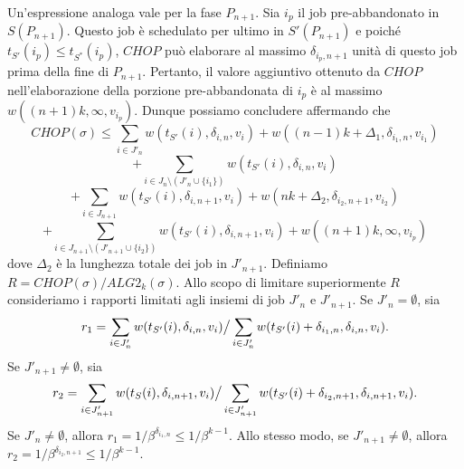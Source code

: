 \documentclass[twoside,openany,titlepage,fleqn,
	headinclude,12pt,a4paper,BCOR5mm,footinclude]{scrbook}
\begin{document}
Un'espressione analoga vale per la fase $P_{n + 1}$. Sia $i_{p}$ il job pre-abbandonato in $S(P_{n + 1})$. Questo job è schedulato per ultimo in $S'(P_{n + 1})$ e poiché $t_{S'}(i_{p}) \leq t_{S^{*}} (i_{p})$, $CHOP$ può elaborare al massimo $\delta_{i_{p}, n+1}$ unità di questo job prima della fine di $P_{n + 1}$. Pertanto, il valore aggiuntivo ottenuto da $CHOP$ nell'elaborazione della porzione pre-abbandonata di $i_{p}$ è al massimo $w ((n + 1) k, \infty,v_{i_{p}}).$ Dunque possiamo concludere affermando che
\begin{equation}
CHOP(\sigma) \leq \sum_{i \in J'_{n}} w (t_{S'}(i), \delta_{i,n},v_{i}) + w ((n - 1) k + \Delta_{1}, \delta_{i_{1},n}, v_{i_{1}}) \tag*{(6)}
\end{equation}
$$+ \sum_{i\in J_{n} \setminus (J'_{n}\cup \{i_{1}\})} w(t_{S'}(i), \delta_{i,n},v_{i})$$
\begin{equation}
+ \sum_{i \in J_{n+1}}w (t_{S'} (i), \delta_{i,n + 1},v_{i}) + w (nk + \Delta_{2}, \delta_{i_{2}, n+1}, v_{i_{2}})\tag*{(7)}
\end{equation}
\begin{equation}
+ \sum_{i \in J_{n+1} \setminus (J'_{n+1} \cup \{i_{2}\})} w (t_{S'} (i), \delta_{i,n+1}, v_{i}) + w ((n + 1) k, \infty, v_{i_{p}}) \tag*{(8)}
\end{equation}
dove $\Delta_{2}$ è la lunghezza totale dei job in $J'_{n+1}$. Definiamo $R = CHOP(\sigma) / ALG2_{k} (\sigma).$ Allo scopo di limitare superiormente $R$ consideriamo i rapporti limitati agli insiemi di job $J'_{n}$ e $J'_{n+1}$. Se $J'_{n} = \emptyset$, sia
$$r_{1} = \sum_{i\in J'_{n}} w(t_{S'}(i), \delta_{i,n}, v_{i}) \big{/} \sum_{i \in J'_{n}} w (t_{S'}(i) + \delta_{i_{1},n}, \delta_{i,n}, v_{i}).$$
Se $J'_{n+1} \neq \emptyset$, sia
$$r_{2} = \sum_{i \in J'_{n+1}} w (t_{S} (i), \delta_{i,n+1}, v_{i}) \big{/} \sum_{i \in J'_{n+1}} w (t_{S'} (i) + \delta_{i_{2}, n+1}, \delta_{i,n+1}, v_{i}).$$
Se $J'_{n} \neq \emptyset$, allora $r_{1} = 1 / \beta^{\delta_{i_{1},n}} \leq 1 / \beta^{k-1}$. Allo stesso modo, se $J'_{n+1} \neq \emptyset$, allora $r_{2} = 1 / \beta^{\delta_{i_{2}, n+1}} \leq 1 / \beta^{k-1}$.
\end{document}
